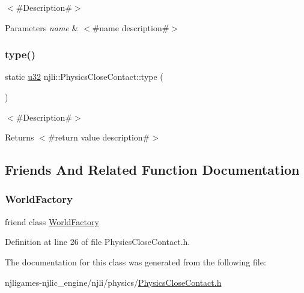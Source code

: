 $<$\#\+Description\#$>$


\begin{DoxyParams}{Parameters}
{\em name} & $<$\#name description\#$>$ \\
\hline
\end{DoxyParams}
\mbox{\label{classnjli_1_1_physics_close_contact_a41098eadbced0e1b4ce390fccffdea4e}} 
\subsubsection{\texorpdfstring{type()}{type()}}
{\footnotesize\ttfamily static \mbox{\hyperlink{_util_8h_a10e94b422ef0c20dcdec20d31a1f5049}{u32}} njli\+::\+Physics\+Close\+Contact\+::type (\begin{DoxyParamCaption}{ }\end{DoxyParamCaption})\hspace{0.3cm}{\ttfamily [static]}}

$<$\#\+Description\#$>$

\begin{DoxyReturn}{Returns}
$<$\#return value description\#$>$ 
\end{DoxyReturn}


\subsection{Friends And Related Function Documentation}
\mbox{\label{classnjli_1_1_physics_close_contact_acb96ebb09abe8f2a37a915a842babfac}} 
\subsubsection{\texorpdfstring{World\+Factory}{WorldFactory}}
{\footnotesize\ttfamily friend class \mbox{\hyperlink{classnjli_1_1_world_factory}{World\+Factory}}\hspace{0.3cm}{\ttfamily [friend]}}



Definition at line 26 of file Physics\+Close\+Contact.\+h.



The documentation for this class was generated from the following file\+:\begin{DoxyCompactItemize}
\item 
njligames-\/njlic\+\_\+engine/njli/physics/\mbox{\hyperlink{_physics_close_contact_8h}{Physics\+Close\+Contact.\+h}}\end{DoxyCompactItemize}
